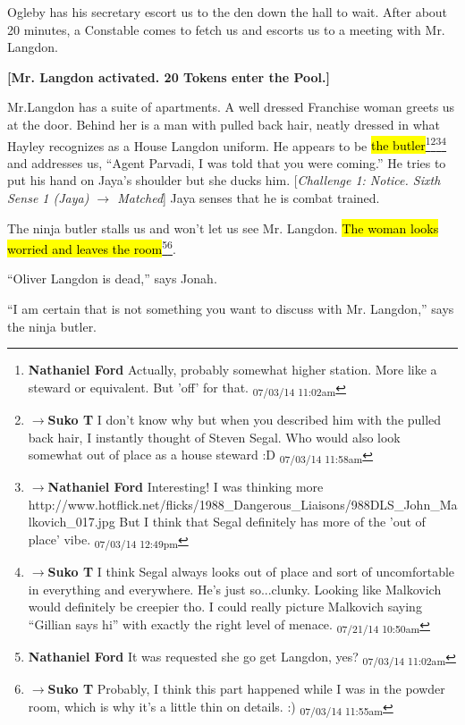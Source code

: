 Ogleby has his secretary escort us to the den down the hall to wait.  After about 20 minutes, a Constable comes to fetch us and escorts us to a meeting with Mr. Langdon.



\textbf{{[}Mr. Langdon activated.  20 Tokens enter the Pool.{]}}



Mr.Langdon has a suite of apartments.  A well dressed Franchise woman greets us at the door.  Behind her is a man with pulled back hair, neatly dressed in what Hayley recognizes as a House Langdon uniform.  He appears to be \hl{the butler}\footnote{\textbf{Nathaniel Ford }Actually, probably somewhat higher station. More like a steward or equivalent. But 'off' for that. \textsubscript{07/03/14 11:02am}}\footnote{$\rightarrow$\textbf{Suko T }I don't know why but when you described him with the pulled back hair, I instantly thought of Steven Segal.  Who would also look somewhat out of place as a house steward :D \textsubscript{07/03/14 11:58am}}\footnote{$\rightarrow$\textbf{Nathaniel Ford }Interesting! I was thinking more http://www.hotflick.net/flicks/1988\_Dangerous\_Liaisons/988DLS\_John\_Malkovich\_017.jpg But I think that Segal definitely has more of the 'out of place' vibe. \textsubscript{07/03/14 12:49pm}}\footnote{$\rightarrow$\textbf{Suko T }I think Segal always looks out of place and sort of uncomfortable in everything and everywhere.  He's just so...clunky.  Looking like Malkovich would definitely be creepier tho.  I could really picture Malkovich saying ``Gillian says hi'' with exactly the right level of menace. \textsubscript{07/21/14 10:50am}} and addresses us, ``Agent Parvadi, I was told that you were coming.''  He tries to put his hand on Jaya's shoulder but she ducks him. {[}\textit{Challenge 1: Notice. Sixth Sense 1 (Jaya) $\rightarrow$ Matched}{]}  Jaya senses that he is combat trained. 



The ninja butler stalls us and won't let us see Mr. Langdon.  \hl{The woman looks worried and leaves the room}\footnote{\textbf{Nathaniel Ford }It was requested she go get Langdon, yes? \textsubscript{07/03/14 11:02am}}\footnote{$\rightarrow$\textbf{Suko T }Probably, I think this part happened while I was in the powder room, which is why it's a little thin on details. :) \textsubscript{07/03/14 11:55am}}.  

``Oliver Langdon is dead,'' says Jonah.

``I am certain that is not something you want to discuss with Mr. Langdon,'' says the ninja butler.


